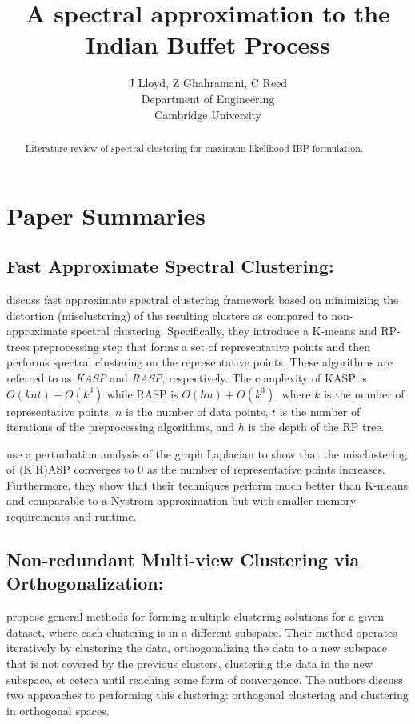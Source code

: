 \documentclass{article}
\title{
A spectral approximation to the Indian Buffet Process
}
\author{
J Lloyd, Z Ghahramani, C Reed\\
Department of Engineering\\
Cambridge University\\
}
\numberwithin{equation}{section}
\numberwithin{thm}{section}
\begin{document}
\maketitle

\begin{abstract}
Literature review of spectral clustering for maximum-likelihood IBP formulation.
\end{abstract}

\section{Paper Summaries}
\subsection{Fast Approximate Spectral Clustering: \citet{yan2009fast}}
\citet{yan2009fast} discuss fast approximate spectral clustering framework based on minimizing the distortion (misclustering) of the resulting clusters as compared to non-approximate spectral clustering. Specifically, they introduce a K-means and RP-trees preprocessing step that forms a set of representative points and then performs spectral clustering on the representative points. These algorithms are referred to as \textit{KASP} and \textit{RASP}, respectively. The complexity of KASP is $O(knt) + O(k^3)$ while RASP is $O(hn) + O(k^3)$, where $k$ is the number of representative points, $n$ is the number of data points, $t$ is the number of iterations of the preprocessing algorithms, and $h$ is the depth of the RP tree.

\citet{yan2009fast} use a perturbation analysis of the graph Laplacian to show that the misclustering of (K|R)ASP converges to 0 as the number of representative points increases. Furthermore, they show that their techniques perform much better than K-means and comparable to a Nystr\"om approximation but with smaller memory requirements and runtime.


\subsection{Non-redundant Multi-view Clustering via Orthogonalization: \citet{Cui2007}}
\citet{Cui2007} propose general methods for forming multiple clustering solutions for a given dataset, where each clustering is in a different subspace. Their method operates iteratively by clustering the data, orthogonalizing the data to a new subspace that is not covered by the previous clusters, clustering the data in the new subspace, et cetera until reaching some form of convergence.  The authors discuss two approaches to performing this clustering: orthogonal clustering and clustering in orthogonal spaces.
\end{document}
